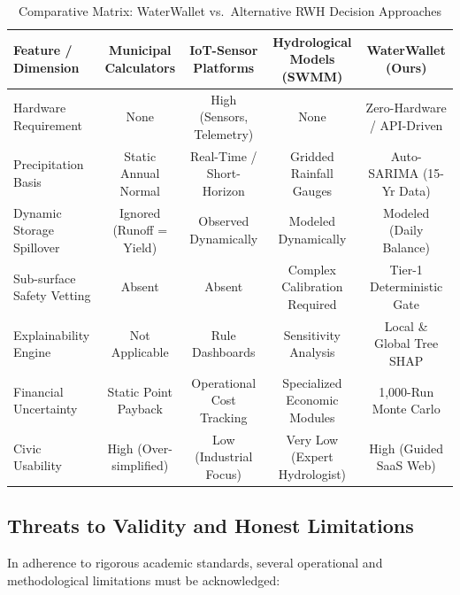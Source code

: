 ﻿\documentclass[conference]{IEEEtran}
\begin{document}
\begin{table}[t]
\caption{Comparative Matrix: WaterWallet vs.\ Alternative RWH Decision Approaches}
\begin{center}
\begin{tabular}{lcccc}
\toprule
\textbf{Feature / Dimension} & \textbf{Municipal Calculators} & \textbf{IoT-Sensor Platforms} & \textbf{Hydrological Models (SWMM)} & \textbf{WaterWallet (Ours)} \\
\midrule
Hardware Requirement          & None                          & High (Sensors, Telemetry)       & None                                  & Zero-Hardware / API-Driven \\
Precipitation Basis           & Static Annual Normal          & Real-Time / Short-Horizon       & Gridded Rainfall Gauges               & Auto-SARIMA (15-Yr Data) \\
Dynamic Storage Spillover     & Ignored (Runoff = Yield)      & Observed Dynamically            & Modeled Dynamically                   & Modeled (Daily Balance) \\
Sub-surface Safety Vetting    & Absent                        & Absent                          & Complex Calibration Required          & Tier-1 Deterministic Gate \\
Explainability Engine         & Not Applicable                & Rule Dashboards                 & Sensitivity Analysis                  & Local \& Global Tree SHAP \\
Financial Uncertainty         & Static Point Payback          & Operational Cost Tracking       & Specialized Economic Modules          & 1,000-Run Monte Carlo \\
Civic Usability               & High (Over-simplified)        & Low (Industrial Focus)          & Very Low (Expert Hydrologist)         & High (Guided SaaS Web) \\
\bottomrule
\end{tabular}
\label{tab:comparison}
\end{center}
\end{table}

\subsection{Threats to Validity and Honest Limitations}
\label{sec:limitations}

In adherence to rigorous academic standards, several operational and methodological limitations must be acknowledged:
\end{document}
